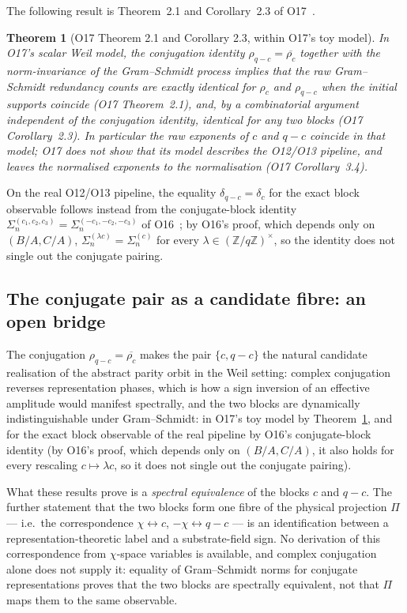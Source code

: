 \documentclass[11pt,a4paper]{article}
\newtheorem{theorem}{Theorem}[section]
\newcommand{\Proj}{\Pi}
\newcommand{\chifield}{\chi}
\newcommand{\rhoc}{\rho_{c}}
\newcommand{\rhoqc}{\rho_{q-c}}
\begin{document}
    The following result is Theorem~2.1 and Corollary~2.3 of O17~\cite{Beau2026a21}.

    \begin{theorem}[O17 Theorem 2.1 and Corollary 2.3, within O17's toy model]
      \label{thm:O17}
      In O17's scalar Weil model, the conjugation identity $\rhoqc = \overline{\rhoc}$ together
      with the norm-invariance of the Gram--Schmidt process implies that the raw Gram--Schmidt
      redundancy counts are exactly identical for $\rhoc$ and $\rhoqc$ when the initial supports
      coincide (O17 Theorem~2.1), and, by a combinatorial argument independent of the conjugation
      identity, identical for any two blocks (O17 Corollary~2.3).
      In particular the raw exponents of $c$ and $q-c$ coincide in that model; O17 does not show
      that its model describes the O12/O13 pipeline, and leaves the normalised exponents to the
      normalisation (O17 Corollary~3.4).
    \end{theorem}

    \noindent
    On the real O12/O13 pipeline, the equality $\delta_{q-c} = \delta_c$ for the exact block
    observable follows instead from the conjugate-block identity
    $\Sigma_n^{(c_1,c_2,c_3)} = \Sigma_n^{(-c_1,-c_2,-c_3)}$ of O16~\cite{Beau2026a20}; by O16's proof, which depends only on $(B/A, C/A)$, $\Sigma_n^{(\lambda c)} = \Sigma_n^{(c)}$ for every $\lambda \in (\mathbb{Z}/q\mathbb{Z})^{\times}$, so the identity does not single out the conjugate pairing.

  \subsection{The conjugate pair as a candidate fibre: an open bridge}
    \label{ssec:identification}

    The conjugation $\rhoqc = \overline{\rhoc}$ makes the pair $\{c, q-c\}$ the natural
    candidate realisation of the abstract parity orbit in the Weil setting: complex
    conjugation reverses representation phases, which is how a sign inversion of an
    effective amplitude would manifest spectrally, and the two blocks are dynamically
    indistinguishable under Gram--Schmidt: in O17's toy model by Theorem~\ref{thm:O17}, and for the
    exact block observable of the real pipeline by O16's conjugate-block identity (by O16's proof, which depends only on $(B/A, C/A)$,
    it also holds for every rescaling $c \mapsto \lambda c$, so it does not single out the conjugate pairing).

    What these results prove is a \emph{spectral equivalence} of the blocks $c$
    and $q-c$.
    The further statement that the two blocks form one fibre of the physical projection
    $\Proj$ --- i.e.\ the correspondence $\chifield \leftrightarrow c$,
    $-\chifield \leftrightarrow q-c$ --- is an identification between a
    representation-theoretic label and a substrate-field sign.
    No derivation of this correspondence from $\chifield$-space variables is available, and
    complex conjugation alone does not supply it: equality of Gram--Schmidt norms for
    conjugate representations proves that the two blocks are spectrally equivalent, not
    that $\Proj$ maps them to the same observable.
\end{document}
